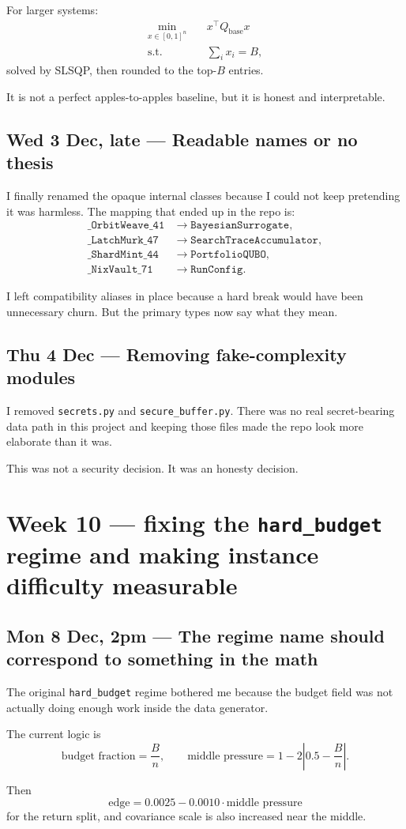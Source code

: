 \documentclass[11pt]{article}
\newcommand{\entry}[2]{\subsection*{#1 --- #2}}
\newcommand{\repo}[1]{\texttt{#1}}
\begin{document}
For larger systems:
\begin{align*}
\min_{x \in [0,1]^n} \quad & x^\top Q_{\text{base}} x \\
\text{s.t.}\quad & \sum_i x_i = B,
\end{align*}
\]
solved by SLSQP, then rounded to the top-\(B\) entries.

It is not a perfect apples-to-apples baseline, but it is honest and interpretable.

\entry{Wed 3 Dec, late}{Readable names or no thesis}

I finally renamed the opaque internal classes because I could not keep pretending it was harmless.
The mapping that ended up in the repo is:
\begin{align*}
\repo{\_OrbitWeave\_41} &\to \repo{BayesianSurrogate},\\
\repo{\_LatchMurk\_47} &\to \repo{SearchTraceAccumulator},\\
\repo{\_ShardMint\_44} &\to \repo{PortfolioQUBO},\\
\repo{\_NixVault\_71} &\to \repo{RunConfig}.
\end{align*}

I left compatibility aliases in place because a hard break would have been unnecessary churn.
But the primary types now say what they mean.

\entry{Thu 4 Dec}{Removing fake-complexity modules}

I removed \repo{secrets.py} and \repo{secure\_buffer.py}.
There was no real secret-bearing data path in this project and keeping those files made the repo
look more elaborate than it was.

This was not a security decision.
It was an honesty decision.

\section*{Week 10 --- fixing the \repo{hard\_budget} regime and making instance difficulty measurable}

\entry{Mon 8 Dec, 2pm}{The regime name should correspond to something in the math}

The original \repo{hard\_budget} regime bothered me because the budget field was not actually doing
enough work inside the data generator.

The current logic is
\[
\text{budget fraction} = \frac{B}{n},
\qquad
\text{middle pressure} = 1 - 2\left|0.5 - \frac{B}{n}\right|.
\]

Then
\[
\text{edge} = 0.0025 - 0.0010 \cdot \text{middle pressure}
\]
for the return split, and covariance scale is also increased near the middle.
\end{document}
